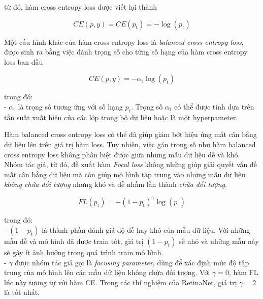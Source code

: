 {    \noindent
    từ đó, hàm cross entropy loss được viết lại thành

    \begin{equation}
        CE(p,y) = CE(p_\textrm{t}) = - \log (p_\textrm{t})
    \end{equation}

    \noindent
    Một cấu hình khác của hàm cross entropy loss là \textit{balanced cross entropy loss}, được sinh ra bằng việc đánh trọng số cho từng số hạng của hàm cross entropy loss ban đầu

    \begin{equation}
        CE(p,y) = - \alpha_\textrm{t} \log (p_\textrm{t})
    \end{equation}

    \noindent
    trong đó: \\
    - $\alpha_\textrm{t}$ là trọng số tương ứng với số hạng $p_\textrm{t}$.
    Trọng số $\alpha_\textrm{t}$ có thể được tính dựa trên tần suất xuất hiện của các lớp trong bộ dữ liệu hoặc là một hyperpameter.

    \noindent
    Hàm balanced cross entropy loss có thể đã giúp giảm bớt hiệu ứng mất cân bằng dữ liệu lên trên giá trị hàm loss.
    Tuy nhiên, việc gán trọng số như hàm balanced cross entropy loss không phân biệt được giữa những mẫu dữ liệu dễ và khó.
    Nhóm tác giả, từ đó, đề xuất hàm \textit{Focal loss} không những giúp giải quyết vấn đề mất cân bằng dữ liệu mà còn giúp mô hình tập trung vào những mẫu dữ liệu \textit{không chứa đối tượng} nhưng khó và dễ nhầm lẫn thành \textit{chứa đối tượng}.

    \begin{equation}
        FL(p_\textrm{t}) = - (1 - p_\textrm{t})^\gamma \log (p_\textrm{t})
    \end{equation}

    \noindent
    trong đó: \\
    - $(1 - p_\textrm{t})$ là thành phần đánh giá độ dễ hay khó của mẫu dữ liệu.
    Với những mẫu dễ và mô hình đã được train tốt, giá trị $(1 - p_\textrm{t})$ sẽ nhỏ và những mẫu này sẽ gây ít ảnh hưởng trong quá trình train mô hình. \\
    - $\gamma$ được nhóm tác giả gọi là \textit{focusing parameter}, dùng để xác định mức độ tập trung của mô hình lên các mẫu dữ liệu không chứa đối tượng.
    Với $\gamma = 0$, hàm FL lúc này tương tự với hàm CE.
    Trong các thí nghiệm của RetinaNet, giá trị $\gamma = 2$ là tốt nhất.

}
